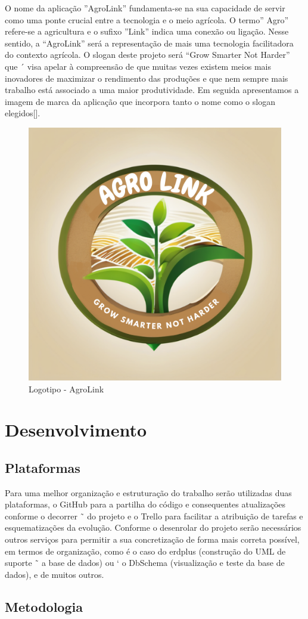 \documentclass[conference]{IEEEtran}
\begin{document}
	O nome da aplicação ”AgroLink” fundamenta-se na sua capacidade de servir como uma ponte
	crucial entre a tecnologia e o meio agrícola. O termo” Agro” refere-se a agricultura e o sufixo
	”Link” indica uma conexão ou ligação. Nesse sentido, a “AgroLink” será a representação de
	mais uma tecnologia facilitadora do contexto agrícola. O slogan deste projeto será “Grow
	Smarter Not Harder” que ´ visa apelar à compreensão de que muitas vezes existem meios mais
	inovadores de maximizar o rendimento das produções e que nem sempre mais trabalho está
	associado a uma maior produtividade. Em seguida apresentamos a imagem de marca da
	aplicação que incorpora tanto o nome como o slogan elegidos[].
	
\begin{figure}[h]
	\centering
	\includegraphics[width=0.4\linewidth]{AGROLINK}
	\caption{Logotipo - AgroLink}
	\label{fig:agrolink}
\end{figure}

	
	\section{Desenvolvimento}
	\subsection{Plataformas}\label{AA}
	Para uma melhor organização e estruturação do trabalho serão utilizadas duas plataformas, o
	GitHub para a partilha do código e consequentes atualizações conforme o decorrer ˜ do
	projeto e o Trello para facilitar a atribuição de tarefas e esquematizações da evolução.
	Conforme o desenrolar do projeto serão necessários outros serviços para permitir a sua
	concretização de forma mais correta possível, em termos de organização, como é o caso do
	erdplus (construção do UML de suporte ˜ a base de dados) ou ` o DbSchema (visualização e
	teste da base de dados), e de muitos outros.
	
	
	\subsection{Metodologia}
	
\end{document}

